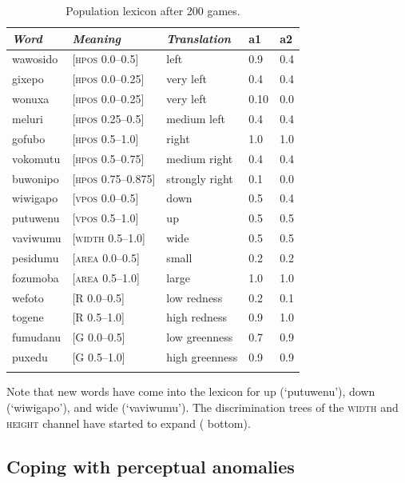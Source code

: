 \begin{table}
\begin{center}
\begin{tabular}{lllll}
\lsptoprule
{\itshape Word}&{\itshape Meaning}&{\itshape Translation} & {\bfshape a1}&{\bfshape a2} \\ \midrule
wawosido & [\textsc{hpos} 0.0–0.5] &left&0.9&0.4\\ 
gixepo & [\textsc{hpos} 0.0–0.25] & very left&0.4&0.4\\ 
wonuxa & [\textsc{hpos} 0.0–0.25] & very left&0.10&0.0\\ 
meluri & [\textsc{hpos} 0.25–0.5] &medium left&0.4&0.4\\ 
gofubo & [\textsc{hpos} 0.5–1.0]& right&1.0&1.0\\ 
vokomutu & [\textsc{hpos} 0.5–0.75] &medium right&0.4&0.4\\ 
buwonipo & [\textsc{hpos} 0.75–0.875] &strongly right&0.1&0.0\\ 
wiwigapo & [\textsc{vpos} 0.0–0.5] &down&0.5&0.4\\ 
putuwenu & [\textsc{vpos} 0.5–1.0]&up & 0.5&0.5\\ 
vaviwumu & [\textsc{width} 0.5–1.0]&wide & 0.5&0.5\\ 
pesidumu & [\textsc{area} 0.0–0.5]&small& 0.2&0.2\\ 
fozumoba & [\textsc{area} 0.5–1.0]&large & 1.0&1.0\\ 
wefoto & [R 0.0–0.5]& low redness &0.2&0.1\\ 
togene & [R 0.5–1.0]& high redness &0.9&1.0\\ 
fumudanu & [G 0.0–0.5]& low greenness &0.7&0.9\\ 
puxedu & [G 0.5–1.0]& high greenness &0.9&0.9\\ 
\lspbottomrule
\end{tabular}
\caption{\label{tab:upper}Population lexicon after 200 games.}
\end{center}
\end{table}
Note that new words have come into the lexicon 
for up (`putuwenu'), down (`wiwigapo'), and 
wide (`vaviwumu'). The discrimination trees of 
the \textsc{width} and \textsc{height} channel have started to 
expand ( bottom). 

\subsection{Coping with perceptual anomalies}

